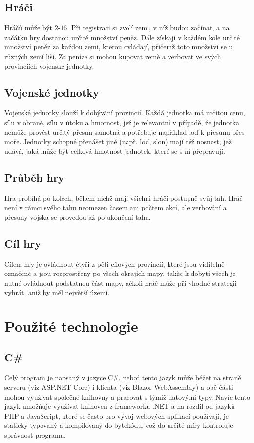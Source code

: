 \documentclass[a4paper,12pt]{article}
\begin{document}
\subsection{Hráči}
Hráčů může být $2$-$16$. Při registraci si zvolí zemi, v níž budou začínat, a na začátku hry dostanou určité množství peněz. Dále získají v každém kole určité množství peněz za každou zemi, kterou ovládají, přičemž toto množství se u různých zemí liší. Za peníze si mohou kupovat země a verbovat ve svých provinciích vojenské jednotky.
\subsection{Vojenské jednotky}
Vojenské jednotky slouží k dobývání provincií. Každá jednotka má určitou cenu, sílu v obraně, sílu v útoku a hmotnost, jež je relevantní v případě, že jednotka nemůže provést určitý přesun samotná a potřebuje například loď k přesunu přes moře. Jednotky schopné přenášet jiné (např. loď, slon) mají též nosnost, jež udává, jaká může být celková hmotnost jednotek, které se s ní přepravují.
\subsection{Průběh hry}
Hra probíhá po kolech, během nichž mají všichni hráči postupně svůj tah. Hráč není v rámci svého tahu neomezen časem ani počtem akcí, ale verbování a přesuny vojska se provedou až po ukončení tahu.
\subsection{Cíl hry}
Cílem hry je ovládnout čtyři z pěti cílových provincií, které jsou viditelně označené a jsou rozprostřeny po všech okrajích mapy, takže k dobytí všech je nutné ovládnout podstatnou část mapy, ačkoli hráč může při vhodné strategii vyhrát, aniž by měl největší území.

\section{Použité technologie}
\subsection{C\#}
Celý program je napsaný v jazyce C\#, neboť tento jazyk může běžet na straně serveru (viz ASP.NET Core) i klienta (viz Blazor WebAssembly) a obě části mohou využívat společné knihovny a pracovat s týmiž datovými typy. Navíc tento jazyk umožňuje využívat knihoven z frameworku .NET a na rozdíl od jazyků PHP a JavaScript, které se často pro vývoj webových aplikací používají, je staticky typovaný a kompilovaný do bytekódu, což do určité míry kontroluje správnost programu.
\end{document}
